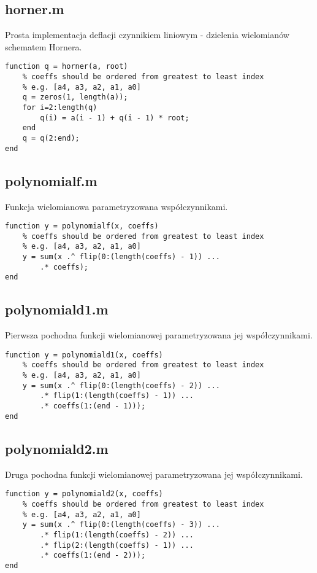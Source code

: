 \documentclass[12pt]{article}
\begin{document}
\subsection{horner.m}
Prosta implementacja deflacji czynnikiem liniowym - dzielenia wielomianów schematem Hornera.
\begin{verbatim}
function q = horner(a, root)
    % coeffs should be ordered from greatest to least index
    % e.g. [a4, a3, a2, a1, a0]
    q = zeros(1, length(a));
    for i=2:length(q)
        q(i) = a(i - 1) + q(i - 1) * root;
    end
    q = q(2:end);
end
\end{verbatim}

\subsection{polynomialf.m}
Funkcja wielomianowa parametryzowana współczynnikami.
\begin{verbatim}
function y = polynomialf(x, coeffs)
    % coeffs should be ordered from greatest to least index
    % e.g. [a4, a3, a2, a1, a0]
    y = sum(x .^ flip(0:(length(coeffs) - 1)) ...
        .* coeffs);
end
\end{verbatim}

\subsection{polynomiald1.m}
Pierwsza pochodna funkcji wielomianowej parametryzowana jej współczynnikami.
\begin{verbatim}
function y = polynomiald1(x, coeffs)
    % coeffs should be ordered from greatest to least index
    % e.g. [a4, a3, a2, a1, a0]
    y = sum(x .^ flip(0:(length(coeffs) - 2)) ...
        .* flip(1:(length(coeffs) - 1)) ...
        .* coeffs(1:(end - 1)));
end
\end{verbatim}

\subsection{polynomiald2.m}
Druga pochodna funkcji wielomianowej parametryzowana jej współczynnikami.
\begin{verbatim}
function y = polynomiald2(x, coeffs)
    % coeffs should be ordered from greatest to least index
    % e.g. [a4, a3, a2, a1, a0]
    y = sum(x .^ flip(0:(length(coeffs) - 3)) ...
        .* flip(1:(length(coeffs) - 2)) ...
        .* flip(2:(length(coeffs) - 1)) ...
        .* coeffs(1:(end - 2)));
end
\end{verbatim}
\end{document}
